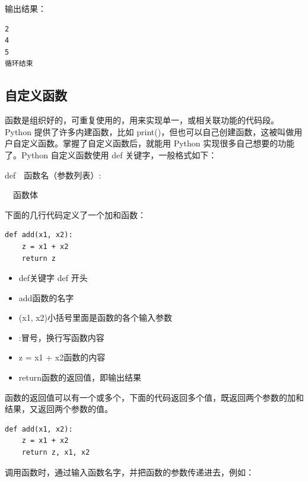 输出结果：
\begin{lstlisting}[Language=Python]
2
4
5
循环结束
\end{lstlisting}


\subsection{自定义函数}

函数是组织好的，可重复使用的，用来实现单一，或相关联功能的代码段。Python 提供了许多内建函数，比如 print()，但也可以自己创建函数，这被叫做用户自定义函数。掌握了自定义函数后，就能用 Python 实现很多自己想要的功能了。Python 自定义函数使用 def 关键字，一般格式如下：
\begin{center}
\begin{tcolorbox} [title = Python 自定义函数的一般格式]
  \bf
  \begin{tcboutputlisting}
    def~~函数名（参数列表）:

    \quad ~~函数体
\end{tcboutputlisting}
\end{tcolorbox}
\end{center}

下面的几行代码定义了一个加和函数：
\begin{lstlisting}[Language=Python]
def add(x1, x2):
    z = x1 + x2
    return z
\end{lstlisting}

\begin{itemize}
  \item def\quad 关键字 def 开头
  \item add\quad 函数的名字
  \item (x1, x2)\quad 小括号里面是函数的各个输入参数
  \item :\quad 冒号，换行写函数内容 %

  \item z = x1 + x2\quad 函数的内容
\item return\quad 函数的返回值，即输出结果
\end{itemize}

函数的返回值可以有一个或多个，下面的代码返回多个值，既返回两个参数的加和结果，又返回两个参数的值。

\begin{lstlisting}[Language=Python]
def add(x1, x2):
    z = x1 + x2
    return z, x1, x2
\end{lstlisting}

调用函数时，通过输入函数名字，并把函数的参数传递进去，例如：

